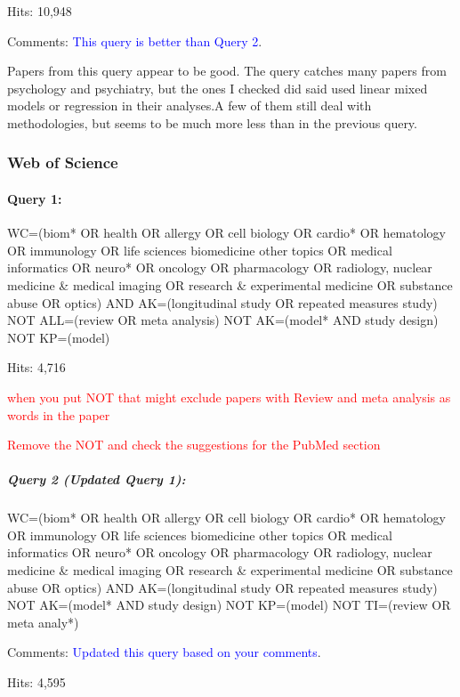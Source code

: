 \documentclass[
]{article}
\let\oldparagraph\paragraph
\renewcommand{\paragraph}[1]{\oldparagraph{#1}\mbox{}}
\let\oldsubparagraph\subparagraph
\renewcommand{\subparagraph}[1]{\oldsubparagraph{#1}\mbox{}}
\newcommand{\BN}[1]{\textcolor{red}{#1}}
\begin{document}
Hits: 10,948

Comments: \textcolor{blue}{This query is better than Query 2}.

Papers from this query appear to be good. The query catches many papers
from psychology and psychiatry, but the ones I checked did said used
linear mixed models or regression in their analyses.A few of them still
deal with methodologies, but seems to be much more less than in the
previous query.

\hypertarget{web-of-science}{%
\subsubsection{Web of Science}\label{web-of-science}}

\hypertarget{query-1}{%
\paragraph{Query 1:}\label{query-1}}

WC=(biom* OR health OR allergy OR cell biology OR cardio* OR hematology
OR immunology OR life sciences biomedicine other topics OR medical
informatics OR neuro* OR oncology OR pharmacology OR radiology, nuclear
medicine \& medical imaging OR research \& experimental medicine OR
substance abuse OR optics) AND AK=(longitudinal study OR repeated
measures study) NOT ALL=(review OR meta analysis) NOT AK=(model* AND
study design) NOT KP=(model)

Hits: 4,716

\BN{when you put NOT that might exclude papers with Review and meta analysis as words in the paper}

\BN{Remove the NOT and check the suggestions for the PubMed section}

\hypertarget{query-2-updated-query-1}{%
\subparagraph{Query 2 (Updated Query
1):}\label{query-2-updated-query-1}}

WC=(biom* OR health OR allergy OR cell biology OR cardio* OR hematology
OR immunology OR life sciences biomedicine other topics OR medical
informatics OR neuro* OR oncology OR pharmacology OR radiology, nuclear
medicine \& medical imaging OR research \& experimental medicine OR
substance abuse OR optics) AND AK=(longitudinal study OR repeated
measures study) NOT AK=(model* AND study design) NOT KP=(model) NOT
TI=(review OR meta analy*)

Comments: \textcolor{blue}{Updated this query based on your comments}.

Hits: 4,595
\end{document}
